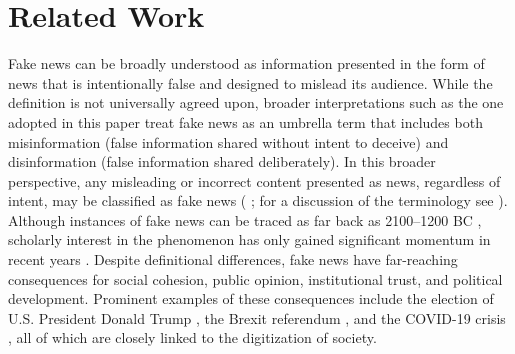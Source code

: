 \documentclass[12pt,a4paper,twocolumn]{article}
\begin{document}
\section{Related Work}
Fake news can be broadly understood as information presented in the form of news that is intentionally false and designed to mislead its audience. While the definition is not universally agreed upon, broader interpretations such as the one adopted in this paper treat fake news as an umbrella term that includes both misinformation (false information shared without intent to deceive) and disinformation (false information shared deliberately). In this broader perspective, any misleading or incorrect content presented as news, regardless of intent, may be classified as fake news (\citeauthor{deOliveira2021} \citeyear{deOliveira2021}; for a discussion of the terminology see \citeauthor{article} \citeyear{article}). Although instances of fake news can be traced as far back as 2100–1200 BC \citep{Roozenbeek2024Psychology}, scholarly interest in the phenomenon has only gained significant momentum in recent years \citep{info15120742}. Despite definitional differences, fake news have far-reaching consequences for social cohesion, public opinion, institutional trust, and political development. Prominent examples of these consequences include the election of U.S. President Donald Trump \citep{allcott2017social}, the Brexit referendum \citep{orlando2023posttruth}, and the COVID-19 crisis \citep{ferreira2022impact}, all of which are closely linked to the digitization of society.
\end{document}
